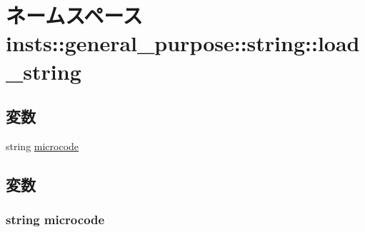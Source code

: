 \hypertarget{namespaceinsts_1_1general__purpose_1_1string_1_1load__string}{
\section{ネームスペース insts::general\_\-purpose::string::load\_\-string}
\label{namespaceinsts_1_1general__purpose_1_1string_1_1load__string}
}
\subsection*{変数}
\begin{DoxyCompactItemize}
\item 
string \hyperlink{namespaceinsts_1_1general__purpose_1_1string_1_1load__string_a770f11a173e99389a8802f0107ed8f52}{microcode}
\end{DoxyCompactItemize}


\subsection{変数}
\hypertarget{namespaceinsts_1_1general__purpose_1_1string_1_1load__string_a770f11a173e99389a8802f0107ed8f52}{
\subsubsection[{microcode}]{\setlength{\rightskip}{0pt plus 5cm}string {\bf microcode}}}
\label{namespaceinsts_1_1general__purpose_1_1string_1_1load__string_a770f11a173e99389a8802f0107ed8f52}
